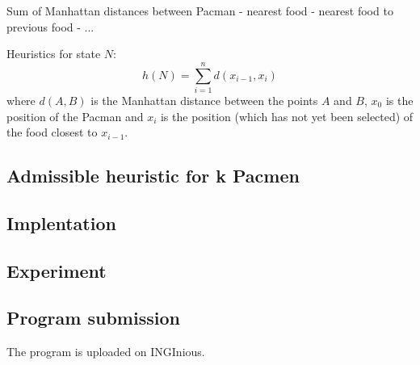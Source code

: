 \documentclass[journal]{IEEEtran}
\begin{document}
Sum of Manhattan distances between Pacman - nearest food - nearest food to previous food - ... 

Heuristics for state $N$:
\[
 h(N) = \sum_{i=1}^n d(x_{i-1},x_i)
\]
where $d(A,B)$ is the Manhattan distance between the points $A$ and $B$, $x_0$ is the position of the Pacman and $x_i$ is the position (which has not yet been selected) of the food closest to $x_{i-1}$.



\subsection{Admissible heuristic for k Pacmen}



\subsection{Implentation}



\subsection{Experiment}



\subsection{Program submission}

The program is uploaded on INGInious.
\end{document}
